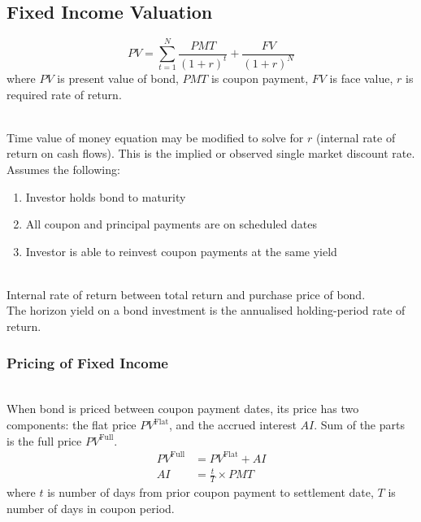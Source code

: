 \subsection{Fixed Income Valuation}

\begin{definition} 
\begin{equation}
PV = \sum\limits_{t=1}^N \frac{PMT}{(1+r)^t} + \frac{FV}{(1+r)^N} \nonumber
\end{equation}
where $PV$ is present value of bond, $PMT$ is coupon payment, $FV$ is face value, $r$ is required rate of return.\\
\end{definition}

\begin{definition} \\
Time value of money equation may be modified to solve for $r$ (internal rate of return on cash flows). This is the implied or observed single market discount rate. Assumes the following:
\begin{enumerate}[label=\roman*.]
\setlength{\itemsep}{0pt}
\item Investor holds bond to maturity
\item All coupon and principal payments are on scheduled dates
\item Investor is able to reinvest coupon payments at the same yield
\end{enumerate}
\end{definition}

\begin{definition} \\
Internal rate of return between total return and purchase price of bond.\\
The horizon yield on a bond investment is the annualised holding-period rate of return.
\end{definition}

\subsubsection{Pricing of Fixed Income}

\begin{definition} \\
When bond is priced between coupon payment dates, its price has two components: the flat price $PV^{\text{Flat}}$, and the accrued interest $AI$. Sum of the parts is the full price $PV^{\text{Full}}$.
\begin{align}
PV^{\text{Full}} &= PV^{\text{Flat}} + AI \nonumber \\
AI &= \frac{t}{T} \times PMT \nonumber
\end{align}
where $t$ is number of days from prior coupon payment to settlement date, $T$ is number of days in coupon period.
\end{definition}

